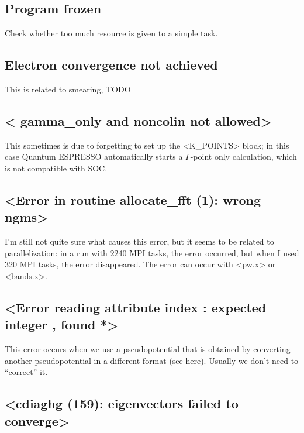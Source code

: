 \documentclass[hyperref, a4paper, 12pt]{report}
\def\texttt#1{<#1>}%
\newcommand{\shortcode}[1]{\texttt{#1}}
\begin{document}
\subsection{Program frozen}


Check whether too much resource is given to a simple task.

\subsection{Electron convergence not achieved}

This is related to smearing, TODO 

\subsection{\shortcode{  gamma_only and noncolin not allowed}}

This sometimes is due to forgetting to set up the \shortcode{K_POINTS} block; 
in this case Quantum ESPRESSO automatically starts a $\Gamma$-point only calculation,
which is not compatible with SOC.

\subsection{\shortcode{Error in routine allocate_fft (1): wrong ngms}}\label{sec:ngms}

I'm still not quite sure what causes this error,
but it seems to be related to parallelization:
in a run with 2240 MPI tasks, 
the error occurred,
but when I used 320 MPI tasks,
the error disappeared.
The error can occur with \shortcode{pw.x} or \shortcode{bands.x}.

\subsection{\shortcode{Error reading attribute index : expected integer , found *}}

This error occurs when we use a pseudopotential 
that is obtained by converting another pseudopotential in a different format
(see \href{https://lists.quantum-espresso.org/pipermail/users/2021-February/046995.html}{here}). 
Usually we don't need to ``correct'' it.

\subsection{\shortcode{cdiaghg (159): eigenvectors failed to converge}}
\end{document}
